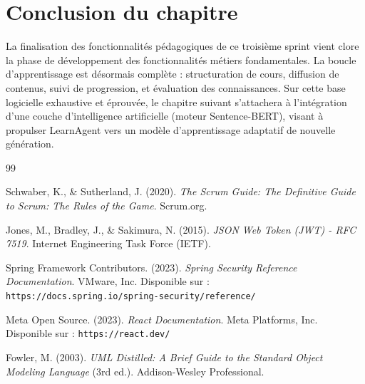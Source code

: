 \documentclass[12pt,a4paper]{report}
\begin{document}
\section*{Conclusion du chapitre}
La finalisation des fonctionnalités pédagogiques de ce troisième sprint vient clore la phase de développement des fonctionnalités métiers fondamentales. La boucle d'apprentissage est désormais complète : structuration de cours, diffusion de contenus, suivi de progression, et évaluation des connaissances. Sur cette base logicielle exhaustive et éprouvée, le chapitre suivant s'attachera à l'intégration d'une couche d'intelligence artificielle (moteur Sentence-BERT), visant à propulser LearnAgent vers un modèle d'apprentissage adaptatif de nouvelle génération.

\newpage

\renewcommand\bibname{Références bibliographiques}
\begin{thebibliography}{99}

Schwaber, K., \& Sutherland, J. (2020). \textit{The Scrum Guide: The Definitive Guide to Scrum: The Rules of the Game}. Scrum.org.

Jones, M., Bradley, J., \& Sakimura, N. (2015). \textit{JSON Web Token (JWT) - RFC 7519}. Internet Engineering Task Force (IETF).

Spring Framework Contributors. (2023). \textit{Spring Security Reference Documentation}. VMware, Inc. Disponible sur : \texttt{https://docs.spring.io/spring-security/reference/}

Meta Open Source. (2023). \textit{React Documentation}. Meta Platforms, Inc. Disponible sur : \texttt{https://react.dev/}

Fowler, M. (2003). \textit{UML Distilled: A Brief Guide to the Standard Object Modeling Language} (3rd ed.). Addison-Wesley Professional.

\end{thebibliography}
\end{document}
